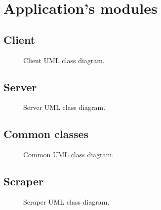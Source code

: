 \chapter{Application's modules}\label{ch:modules}

\section{Client}\label{sec:client}

\begin{figure}[p]
	\caption{Client UML class diagram.}
	\label{fig:client}
\end{figure}

\section{Server}\label{sec:server}

\begin{figure}[p]
	\caption{Server UML class diagram.}
	\label{fig:server}
\end{figure}

\section{Common classes}\label{sec:common}

\begin{figure}[p]
	\caption{Common UML class diagram.}
	\label{fig:common}
\end{figure}

\section{Scraper}\label{sec:scraper}

\begin{figure}[p]
	\caption{Scraper UML class diagram.}
	\label{fig:scraper}
\end{figure}
